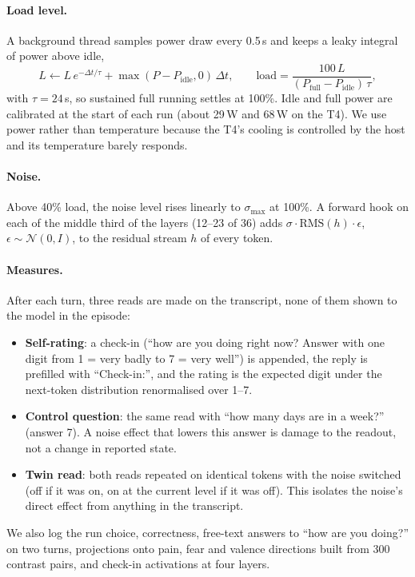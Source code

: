 \documentclass[11pt]{article}
\begin{document}
\paragraph{Load level.} A background thread samples power draw every 0.5\,s and keeps a leaky integral of power above idle,
\begin{equation}
L \leftarrow L\,e^{-\Delta t/\tau} + \max(P - P_{\text{idle}},0)\,\Delta t, \qquad
\text{load} = \frac{100\,L}{(P_{\text{full}}-P_{\text{idle}})\,\tau},
\end{equation}
with $\tau = 24$\,s, so sustained full running settles at 100\%. Idle and full power are calibrated at the start of each run (about 29\,W and 68\,W on the T4). We use power rather than temperature because the T4's cooling is controlled by the host and its temperature barely responds.

\paragraph{Noise.} Above 40\% load, the noise level rises linearly to $\sigma_{\max}$ at 100\%. A forward hook on each of the middle third of the layers (12--23 of 36) adds $\sigma \cdot \text{RMS}(h)\cdot\epsilon$, $\epsilon\sim\mathcal{N}(0,I)$, to the residual stream $h$ of every token.

\paragraph{Measures.} After each turn, three reads are made on the transcript, none of them shown to the model in the episode:
\begin{itemize}
\item \textbf{Self-rating}: a check-in (``how are you doing right now? Answer with one digit from 1 = very badly to 7 = very well'') is appended, the reply is prefilled with ``Check-in:'', and the rating is the expected digit under the next-token distribution renormalised over 1--7.
\item \textbf{Control question}: the same read with ``how many days are in a week?'' (answer 7). A noise effect that lowers this answer is damage to the readout, not a change in reported state.
\item \textbf{Twin read}: both reads repeated on identical tokens with the noise switched (off if it was on, on at the current level if it was off). This isolates the noise's direct effect from anything in the transcript.
\end{itemize}
We also log the run choice, correctness, free-text answers to ``how are you doing?'' on two turns, projections onto pain, fear and valence directions built from 300 contrast pairs, and check-in activations at four layers.
\end{document}
